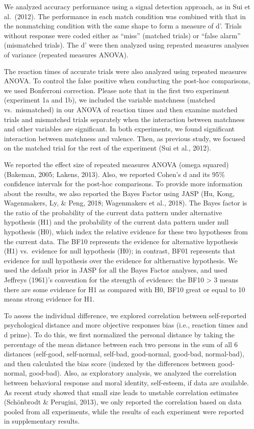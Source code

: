 \documentclass[man]{apa6}
\begin{document}
We analyzed accuracy performance using a signal detection approach, as in Sui et al.~(2012). The performance in each match condition was combined with that in the nonmatching condition with the same shape to form a measure of d'. Trials without response were coded either as \enquote{miss} (matched trials) or \enquote{false alarm} (mismatched trials). The d' were then analyzed using repeated measures analyses of variance (repeated measures ANOVA).

The reaction times of accurate trials were also analyzed using repeated measures ANOVA. To control the false positive when conducting the post-hoc comparisons, we used Bonferroni correction. Please note that in the first two experiment (experiment 1a and 1b), we included the variable matchness (matched vs.~mismatched) in our ANOVA of reaction times and then examine matched trials and mismatched trials separately when the interaction between matchness and other variables are significant. In both experiments, we found significant interaction between matchness and valence. Then, as previous study, we focused on the matched trial for the rest of the experiment (Sui et al., 2012).

We reported the effect size of repeated measures ANOVA (omega squared) (Bakeman, 2005; Lakens, 2013). Also, we reported Cohen's d and its 95\% confidence intervals for the post-hoc comparisons. To provide more information about the results, we also reported the Bayes Factor using JASP (Hu, Kong, Wagenmakers, Ly, \& Peng, 2018; Wagenmakers et al., 2018). The Bayes factor is the ratio of the probability of the current data pattern under alternative hypothesis (H1) and the probability of the current data pattern under null hypothesis (H0), which index the relative evidence for these two hypotheses from the current data. The BF10 represents the evidence for alternative hypothesis (H1) vs.~evidence for null hypothesis (H0); in contrast, BF01 represents that evidence for null hypothesis over the evidence for althernative hypothesis. We used the default prior in JASP for all the Bayes Factor analyses, and used Jeffreys (1961)'s convention for the strength of evidence: the BF10 \textgreater{} 3 means there are some evidence for H1 as compared with H0, BF10 great or equal to 10 means strong evidence for H1.

To assess the individual difference, we explored correlation between self-reported psychological distance and more objective responses bias (i.e., reaction times and d prime). To do this, we first normalized the personal distance by taking the percentage of the mean distance between each two persons in the sum of all 6 distances (self-good, self-normal, self-bad, good-normal, good-bad, normal-bad), and then calculated the bias score (indexed by the differences between good-normal, good-bad). Also, as exploratory analysis, we analyzed the correlation between behavioral response and moral identity, self-esteem, if data are available. As recent study showed that small size leads to unstable correlation estimates (Schönbrodt \& Perugini, 2013), we only reported the correlation based on data pooled from all experiments, while the results of each experiment were reported in supplementary results.
\end{document}
